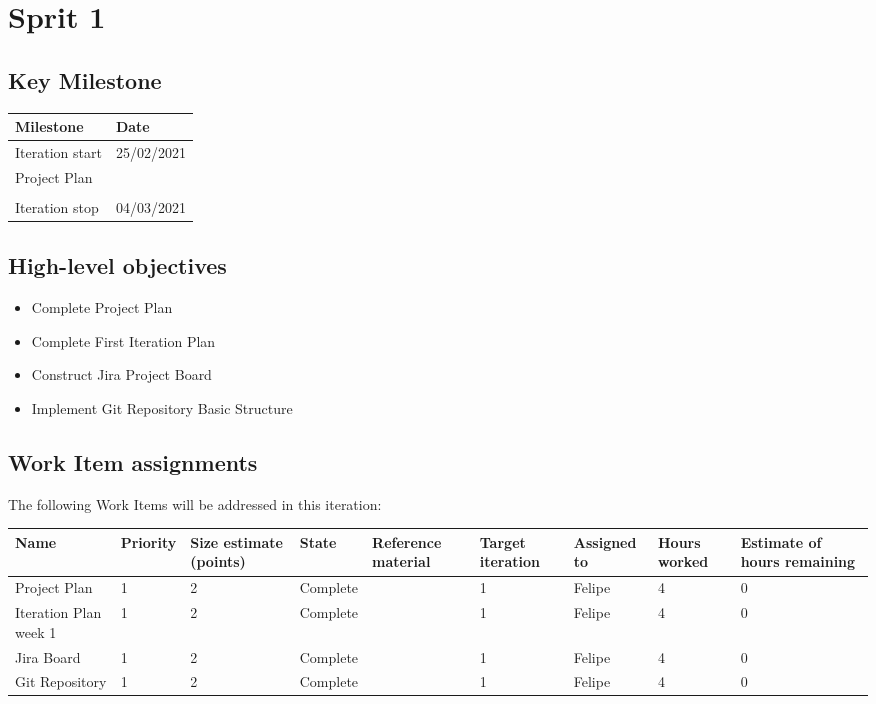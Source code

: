 \clearpage
\section{Sprit 1}

\subsection*{Key Milestone}

\noindent\begin{tabular}{|l|l|}
\hline
Milestone       & Date \\ \hline
Iteration start & 25/02/2021  \\ \hline
Project Plan    &      \\ \hline
                &      \\ \hline
Iteration stop  &  04/03/2021 \\ \hline
\end{tabular}

\subsection*{High-level objectives}

\begin{itemize}
	\item Complete Project Plan
	\item	Complete First Iteration Plan
	\item	Construct Jira Project Board
	\item Implement Git Repository Basic Structure
\end{itemize}

\subsection*{Work Item assignments}

The following Work Items will be addressed in this iteration:

\begin{adjustbox}{width=\textwidth}
\noindent\begin{tabular}{|l|l|l|l|l|l|l|l|l|}
\hline
Name & Priority & Size estimate (points) & State & Reference material & Target iteration & Assigned to & Hours worked & Estimate of hours remaining \\ \hline
Project Plan    & 1 &  2 &  Complete  & & 1 & Felipe & 4 & 0 \\ \hline
Iteration Plan week 1 & 1 &  2 &  Complete  & & 1 & Felipe & 4 & 0 \\ \hline
Jira Board & 1 &  2 &  Complete  & & 1 & Felipe & 4 & 0 \\ \hline
Git Repository & 1 &  2 &  Complete  & & 1 & Felipe & 4 & 0 \\ \hline
\end{tabular}
\end{adjustbox}

